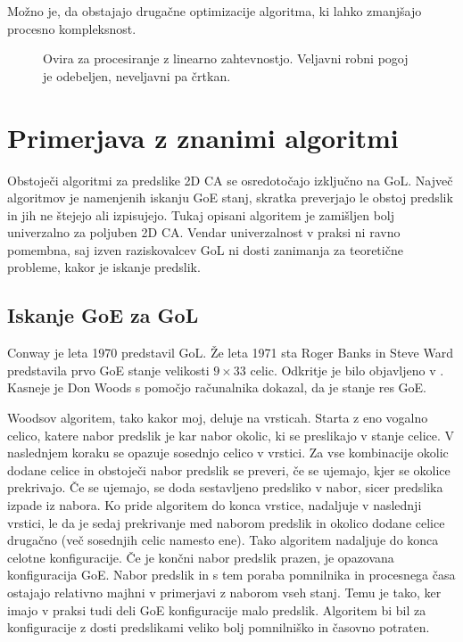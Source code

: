 \documentclass[12pt,a4paper,openany,twoside]{book}
\begin{document}
Možno je, da obstajajo drugačne optimizacije algoritma, ki lahko zmanjšajo procesno kompleksnost.

\begin{figure}[htb]
\centerline{}
\caption[Ovira za procesiranje z linearno zahtevnostjo.]
{Ovira za procesiranje z linearno zahtevnostjo.
Veljavni robni pogoj je odebeljen, neveljavni pa črtkan.}
\label{algorithm_issue}
\end{figure}

\chapter{Primerjava z znanimi algoritmi}

Obstoječi algoritmi za predslike 2D CA se osredotočajo izključno na GoL.
Največ algoritmov je namenjenih iskanju GoE stanj, skratka preverjajo le
obstoj predslik in jih ne štejejo ali izpisujejo. Tukaj opisani algoritem
je zamišljen bolj univerzalno za poljuben 2D CA. Vendar univerzalnost v
praksi ni ravno pomembna, saj izven raziskovalcev GoL ni dosti zanimanja
za teoretične probleme, kakor je iskanje predslik.

\section{Iskanje GoE za GoL}

Conway je leta 1970 predstavil GoL. Že leta 1971 sta Roger Banks in Steve Ward
predstavila prvo GoE stanje velikosti \(9 \times 33\) celic.
Odkritje je bilo objavljeno v \cite{Lifeline3}. Kasneje je Don Woods
\cite{Lifeline3, Lifeline4} s pomočjo računalnika dokazal, da je stanje res GoE.

Woodsov algoritem, tako kakor moj, deluje na vrsticah.
Starta z eno vogalno celico, katere nabor predslik je kar nabor okolic,
ki se preslikajo v stanje celice. V naslednjem koraku se opazuje sosednjo celico v vrstici.
Za vse kombinacije okolic dodane celice in obstoječi nabor predslik se preveri,
če se ujemajo, kjer se okolice prekrivajo. Če se ujemajo, se doda sestavljeno predsliko v nabor,
sicer predslika izpade iz nabora. Ko pride algoritem do konca vrstice, nadaljuje v naslednji vrstici,
le da je sedaj prekrivanje med naborom predslik in okolico dodane celice drugačno (več sosednjih celic namesto ene).
Tako algoritem nadaljuje do konca celotne konfiguracije.
Če je končni nabor predslik prazen, je opazovana konfiguracija GoE.
Nabor predslik in s tem poraba pomnilnika in procesnega časa ostajajo
relativno majhni v primerjavi z naborom vseh stanj.
Temu je tako, ker imajo v praksi tudi deli GoE konfiguracije malo predslik.
Algoritem bi bil za konfiguracije z dosti predslikami veliko bolj pomnilniško in časovno potraten.
\end{document}
